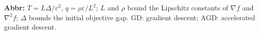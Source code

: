 \begin{table}[tp]
\begin{threeparttable}
\begin{tabularx}{\linewidth}{@{}>{\raggedright\arraybackslash}p{0.20\linewidth}>{\raggedright\arraybackslash}p{0.32\linewidth}>{\raggedright\arraybackslash}p{0.25\linewidth}>{\raggedright\arraybackslash}X@{}}
\bottomrule
\end{tabularx}
\begin{tablenotes}[flushleft]\footnotesize
\item[] \textbf{Abbr:} $T=L\Delta/\varepsilon^2$, $q=\rho\varepsilon/L^2$; $L$ and $\rho$ bound the Lipschitz constants of $\nabla f$ and $\nabla^2 f$; $\Delta$ bounds the initial objective gap. GD: gradient descent; AGD: accelerated gradient descent.
\end{tablenotes}
\end{threeparttable}
\end{table}
\clearpage
